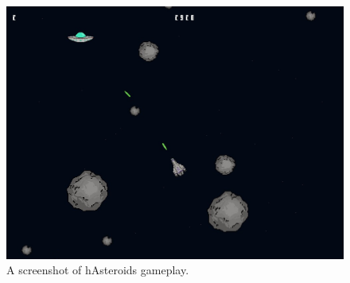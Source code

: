 \documentclass[
  digital, %
  color,   %
  table,   %
  oneside, %
  lof,     %
  lot,     %
]{fithesis3}
\begin{document}
\begin{figure}[hbt!]
    \centering
    \includegraphics[width=\textwidth]{images/hasteroids-screenshot.jpg}
    \caption{A screenshot of hAsteroids gameplay.}
    \label{fig:hasteroidsscreenshot}
\end{figure}
\end{document}
